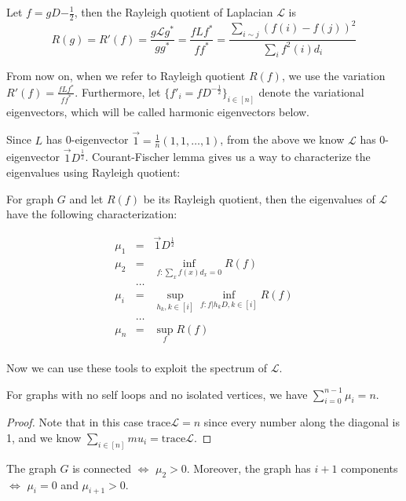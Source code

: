 \begin{fact}
Let $f=gD{-\frac{1}{2}}$, then the Rayleigh quotient of Laplacian
$\mathcal{L}$ is
\begin{equation*}
R(g)=R'(f)=\frac{g\mathcal{L}g^*}{gg^*}=\frac{fLf^*}{ff^*}=\frac{\sum_{i\sim
j} (f(i)-f(j))^2}{\sum_i f^2(i) d_i}
\end{equation*}

From now on, when we refer to Rayleigh quotient $R(f)$, we use the
variation $R'(f)=\frac{fLf^*}{ff^*}$. Furthermore, let
$\{f'_i=fD^{-\frac{1}{2}}\}_{i\in[n]}$ denote the variational
eigenvectors, which will be called harmonic eigenvectors below.
\end{fact}

Since $L$ has 0-eigenvector $\overrightarrow{1}=\frac{1}{n}(1, 1,
\dots, 1)$, from the above we know $\mathcal{L}$ has 0-eigenvector
$\overrightarrow{1}D^{\frac{1}{2}}$. Courant-Fischer lemma gives us
a way to characterize the eigenvalues using Rayleigh quotient:

\begin{proposition}
For graph $G$ and let $R(f)$ be its Rayleigh quotient, then the
eigenvalues of $\mathcal{L}$ have the following characterization:

\begin{eqnarray*}
\mu_1 & = &  \overrightarrow{1}D^{\frac{1}{2}}\\
\mu_2 & = &  \inf_{f: \sum_x f(x)d_x=0}R(f)\\
&\dots& \\
\mu_i & = & \sup_{h_k, k\in[i]} \inf_{f: f \vert h_k D, k\in[i]} R(f)\\
&\dots& \\
\mu_n & = & \sup_f R(f)\\
\end{eqnarray*}
\end{proposition}

Now we can use these tools to exploit the spectrum of $\mathcal{L}$.

\begin{fact}
For graphs with no self loops and no isolated vertices, we have
$\sum_{i=0}^{n-1} \mu_i=n.$
\end{fact}

\begin{proof}
Note that in this case $\text{trace}\mathcal{L}=n$ since every
number along the diagonal is 1, and we know $\sum_{i\in[n]}
mu_i=\text{trace}\mathcal{L}. $
\end{proof}

\begin{fact} \label{connected}
The graph $G$ is connected $\Leftrightarrow$ $\mu_2>0$. Moreover,
the graph has $i+1$ components $\Leftrightarrow$ $\mu_i=0$ and
$\mu_{i+1}>0$.
\end{fact}


